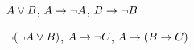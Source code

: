 \begin{practiceproblems}
\begin{problemslist}
		\item $A \vee B$, $A \rightarrow \neg A$, $B \rightarrow \neg B$ \vspace{.5ex}%
		
		
		\item $\neg(\neg A \vee B) $, $A \rightarrow \neg C$, $A \rightarrow (B \rightarrow C)$\vspace{.5ex} %
		
		

\end{problemslist}
\end{practiceproblems}
